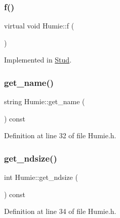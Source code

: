 \subsubsection{\texorpdfstring{f()}{f()}}
{\footnotesize\ttfamily virtual void Humie\+::f (\begin{DoxyParamCaption}{ }\end{DoxyParamCaption})\hspace{0.3cm}{\ttfamily [pure virtual]}}



Implemented in \mbox{\hyperlink{class_stud_a6ebf0056208a353346da33a779763e4f}{Stud}}.

\mbox{\label{class_humie_ac2878f4f3c6d4c9450e286401d96d50c}} 
\subsubsection{\texorpdfstring{get\_name()}{get\_name()}}
{\footnotesize\ttfamily string Humie\+::get\+\_\+name (\begin{DoxyParamCaption}{ }\end{DoxyParamCaption}) const\hspace{0.3cm}{\ttfamily [inline]}}



Definition at line 32 of file Humie.\+h.

\mbox{\label{class_humie_a403431ff800cd4855abd484061a2aa85}} 
\subsubsection{\texorpdfstring{get\_ndsize()}{get\_ndsize()}}
{\footnotesize\ttfamily int Humie\+::get\+\_\+ndsize (\begin{DoxyParamCaption}{ }\end{DoxyParamCaption}) const\hspace{0.3cm}{\ttfamily [inline]}}



Definition at line 34 of file Humie.\+h.

\mbox{\label{class_humie_a984520f9906583e9daf46c4d6ea21712}} 
